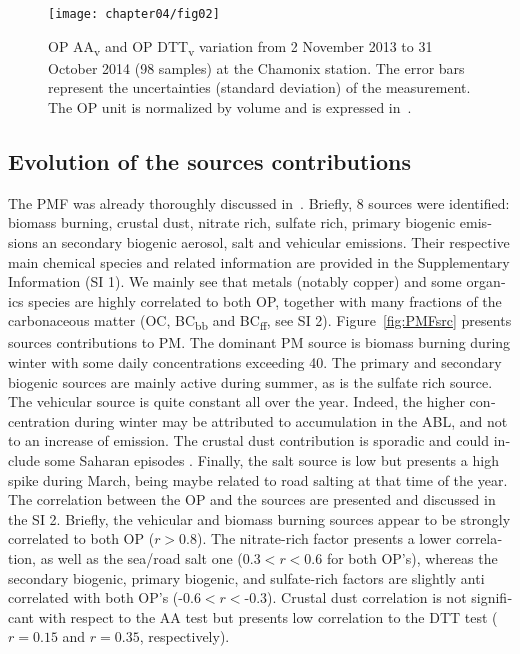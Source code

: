 \begin{otherlanguage}{english}
\begin{figure}[ht]
    \centering
    \texttt{[image: chapter04/fig02]}
    \caption{OP AA\textsubscript{v} and OP DTT\textsubscript{v} variation from
        2 November 2013 to 31 October 2014 (98 samples) at the Chamonix
        station. The error bars represent the uncertainties (standard
        deviation) of the measurement. The OP unit is normalized by volume and
        is expressed in~\si{\opv}.  }
    \label{fig:OPts}
\end{figure}

\subsection{Evolution of the sources contributions}\label{evolution-of-the-sources-contributions}

The PMF was already thoroughly discussed in~\textcite{chevrierChauffage2016}.
Briefly, 8 sources were identified: biomass burning, crustal dust, nitrate rich,
sulfate rich, primary biogenic emissions an secondary biogenic aerosol, salt and
vehicular emissions. Their respective main chemical species and related
information are provided in the Supplementary Information (SI 1). We mainly see
that metals (notably copper) and some organics species are highly correlated to
both OP, together with many fractions of the carbonaceous matter (OC,
BC\textsubscript{bb} and BC\textsubscript{ff}, see SI 2).
Figure~\ref{fig:PMFsrc} presents sources contributions to PM. The dominant PM
source is biomass burning during winter with some daily concentrations exceeding
\SI{40}{\ugm}. The primary and secondary biogenic sources are mainly
active during summer, as is the sulfate rich source. The vehicular source is
quite constant all over the year. Indeed, the higher concentration during
winter may be attributed to accumulation in the ABL, and not to an increase of
emission. The crustal dust contribution is sporadic and
could include some Saharan episodes \parencite{aymozEvolution2004}. Finally, the
salt source is low but presents a high spike during March, being maybe related
to road salting at that time of the year. The correlation between the OP and the
sources are presented and discussed in the SI 2. 
Briefly, the vehicular and biomass burning sources appear to be strongly
correlated to both OP ($r>0.8$). The nitrate-rich factor presents a lower
correlation, as well as the sea/road salt one ($0.3<r<0.6$ for both OP’s),
whereas the secondary biogenic, primary biogenic, and sulfate-rich factors are
slightly anti correlated with both OP’s ($‑0.6<r<‑0.3$). Crustal dust
correlation is not significant with respect to the AA test but presents low
correlation to the DTT test ($r=0.15$ and $r=0.35$, respectively).


\end{otherlanguage}
